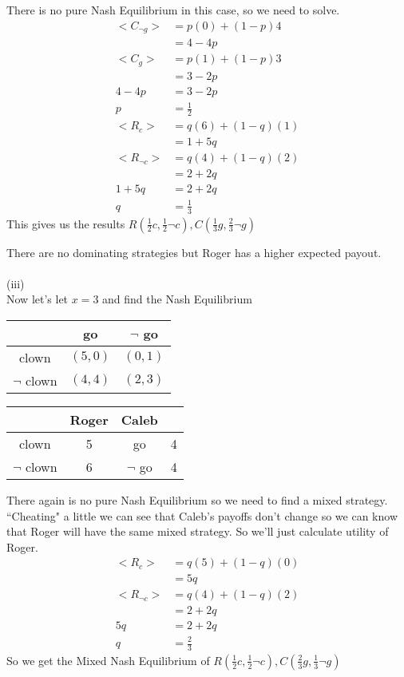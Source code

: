 \documentclass[12pt,letter]{article}
\begin{document}
There is no pure Nash Equilibrium in this case, so we need to solve.
\begin{align*}
    <C_{\neg g}> &= p(0) + (1-p)4\\
        &= 4 - 4p\\
    <C_{g}> &= p(1) + (1-p)3\\
        &= 3 - 2p\\
    4-4p &= 3-2p\\
    p &= \frac12\\
    <R_c> &= q(6) + (1-q)(1)\\
        &= 1 + 5q\\
    <R_{\neg c}> &= q(4) + (1-q)(2)\\
        &= 2 + 2q\\
    1 + 5q &= 2 + 2q\\
    q &= \frac13
\end{align*}
This gives us the results $R(\frac12 c, \frac12 \neg c), C(\frac13 g, \frac23 \neg g)$

There are no dominating strategies but Roger has a higher expected payout.
\\
\\
(iii)\\
Now let's let $x=3$ and find the Nash Equilibrium
\begin{figure*}[h!]
\centering
\begin{tabular}{|c|c|c|}
	\hline
	& go & $\neg$ go\\
	\hline
	clown & $(5,0)$ & $(0,1)$\\
	\hline
	$\neg$ clown & $(4,4)$ & $(2,3)$\\
	\hline
\end{tabular}
\end{figure*}
\begin{figure*}[h!]
\centering
\begin{tabular}{c c|c c}
	& Roger & Caleb\\
	\hline
	clown & 5 & go & 4\\
	$\neg$ clown & 6 & $\neg$ go & 4
\end{tabular}
\end{figure*}
\FloatBarrier
There again is no pure Nash Equilibrium so we need to find a mixed strategy.
``Cheating" a little we can see that Caleb's payoffs don't change so we can 
know that Roger will have the same mixed strategy. So we'll just calculate
utility of Roger.
\begin{align*}
    <R_c> &= q(5) + (1-q)(0)\\
        &= 5q\\
    <R_{\neg c}> &= q(4) + (1-q)(2)\\
        &= 2 + 2q\\
    5q &= 2 + 2q\\
    q &= \frac23
\end{align*}
So we get the Mixed Nash Equilibrium of $R(\frac12 c, \frac12 \neg c), C(\frac23
g, \frac13 \neg g)$
\end{document}
